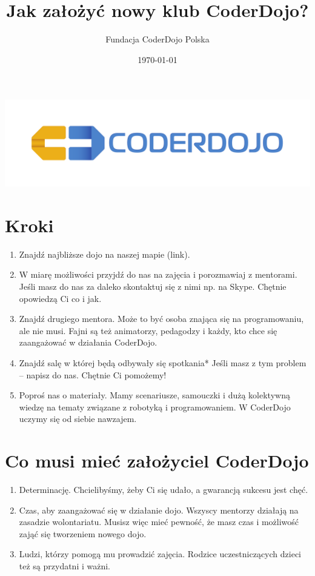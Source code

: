 \documentclass[a4paper]{article}
\title{Jak założyć nowy klub CoderDojo?}
\author{Fundacja CoderDojo Polska}
\date{\today}
\begin{document}
\maketitle
\includegraphics[width=\textwidth]{logo_CD.pdf}

\section{Kroki}
\begin{enumerate}
\item Znajdź najbliższe dojo na naszej mapie (link). 
\item W miarę możliwości przyjdź do nas na zajęcia i porozmawiaj z mentorami. Jeśli masz do nas za daleko skontaktuj się z nimi np. na Skype. Chętnie opowiedzą Ci co i jak.  
\item Znajdź drugiego mentora. Może to być osoba znająca się na programowaniu, ale nie musi. Fajni są też animatorzy, pedagodzy i każdy, kto chce się zaangażować w działania CoderDojo. 
\item Znajdź salę w której będą odbywały się spotkania* Jeśli masz z tym problem – napisz do nas. Chętnie Ci pomożemy!
\item Poproś nas o materiały. Mamy scenariusze, samouczki i dużą kolektywną wiedzę na tematy związane z robotyką i programowaniem. W CoderDojo uczymy się od siebie nawzajem. 
\end{enumerate}


\section{Co musi mieć założyciel CoderDojo}
\begin{enumerate}
\item Determinację. Chcielibyśmy, żeby Ci się udało, a gwarancją sukcesu jest chęć. 
\item Czas, aby zaangażować się w działanie dojo. Wszyscy mentorzy działają na zasadzie wolontariatu. Musisz więc mieć pewność, że masz czas i możliwość zająć się tworzeniem nowego dojo.   
\item Ludzi, którzy pomogą mu prowadzić zajęcia. Rodzice uczestniczących dzieci też są przydatni i ważni. 
\end{enumerate}
\end{document}

